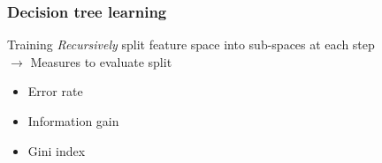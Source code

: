 \documentclass{beamer}
\begin{document}

\begin{frame}
    \frametitle{Decision tree learning}
    \vspace*{-7mm}
    \begin{block}{Training}
        \emph{Recursively} split feature space into sub-spaces at each step\\
        $\to$ Measures to evaluate split
        \begin{itemize}
            \item Error rate
            \item Information gain
            \item Gini index
        \end{itemize}
    \end{block}
\end{frame}

\end{document}
